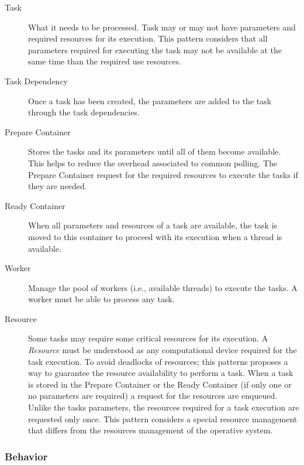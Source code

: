 \begin{description}
	
	\item[Task] 
	What it needs to be processed. Task may or may not have parameters and required resources for its execution. This pattern considers that all parameters required for executing the task may not be available at the same time than the required use resources.
	
	\item[Task Dependency]
	Once a task has been created, the parameters are added to the task through the task dependencies. 
	
	\item[Prepare Container]
	Stores the tasks and its parameters until all of them become available. This helps to reduce the overhead associated to common polling. The Prepare Container request for the required resources to execute the tasks if they are needed.
	
	\item[Ready Container]
	When all parameters and resources of a task are available, the task is moved to this container to proceed with its execution when a thread is available.
	
	\item[Worker]
	Manage the pool of workers (i.e., available threads) to execute the tasks. A worker must be able to process any task.
	
	\item[Resource]
	Some tasks may require some critical resources for its execution. A \textit{Resource} must be understood as any computational device required for the task execution. To avoid deadlocks of resources; this patterns proposes a way to guarantee the resource availability to perform a task. When a task is stored in the Prepare Container or the Ready Container (if only one or no parameters are required) a request for the resources are enqueued. Unlike the tasks parameters, the resources required for a task execution are requested only once. This pattern considers a special resource management that differs from the resources management of the operative system.
	
\end{description}

\subsubsection{Behavior}

